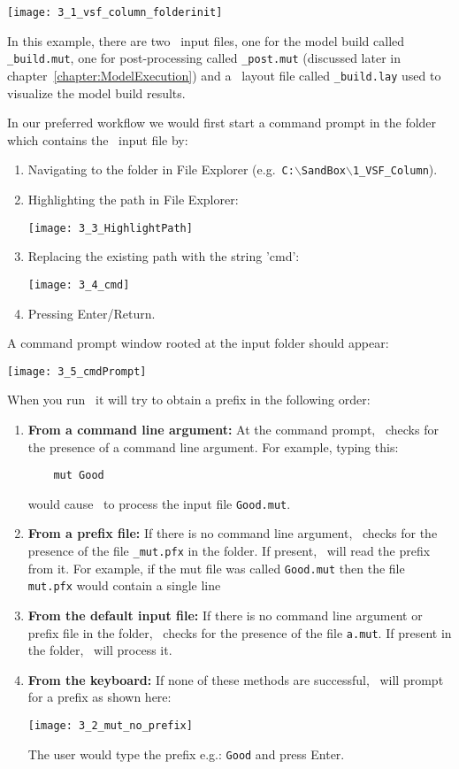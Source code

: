     \texttt{[image: 3\_1\_vsf\_column\_folderinit]}

In this example, there are two \mut\ input files, one for the model build called \texttt{\_build.mut}, one for post-processing called \texttt{\_post.mut} (discussed later in chapter~\ref{chapter:ModelExecution}) and a \tecplot\ layout file called \texttt{\_build.lay} used to visualize the model build results.


 In our preferred workflow we would first start a command prompt in the folder which contains the \mut\ input file by:
\begin{enumerate}
   \item  Navigating to the folder in File Explorer (e.g.\ \texttt{C:$\backslash$SandBox$\backslash$1\_VSF\_Column}).
   \item  Highlighting the path in File Explorer:

        \texttt{[image: 3\_3\_HighlightPath]}

    \item  Replacing the existing path with the string 'cmd':

        \texttt{[image: 3\_4\_cmd]}

    \item Pressing Enter/Return.
\end{enumerate}
A command prompt window rooted at the input folder should appear:

        \texttt{[image: 3\_5\_cmdPrompt]}



When you run \mut\, it will try to obtain a prefix in the following order:
\begin{enumerate}
    \item \textbf{From a command line argument:} \label{commarg} At the command prompt, \mut\ checks for the presence of a command line argument.  For example, typing this:
\begin{verbatim}
    mut Good
\end{verbatim}
        would cause \mut\ to process the input file \texttt{Good.mut}.
    \item \textbf{From a prefix file:} If there is no command line argument, \mut\ checks for the presence of the file \texttt{\_mut.pfx} in the folder.  If present, \mut\ will read the prefix from it. For example, if the mut file was called \texttt{Good.mut} then the file \texttt{mut.pfx} would contain a single line
    \item \textbf{From the default input file:} If there is no command line argument or prefix file in the folder, \mut\ checks for the presence of the file \texttt{a.mut}.  If present in the folder, \mut\ will process it.
    \item \textbf{From the keyboard:} If none of these methods are successful, \mut\ will prompt for a prefix as shown here:

        \texttt{[image: 3\_2\_mut\_no\_prefix]}

        The user would type the prefix e.g.: \texttt{Good} and press Enter.

\end{enumerate}

